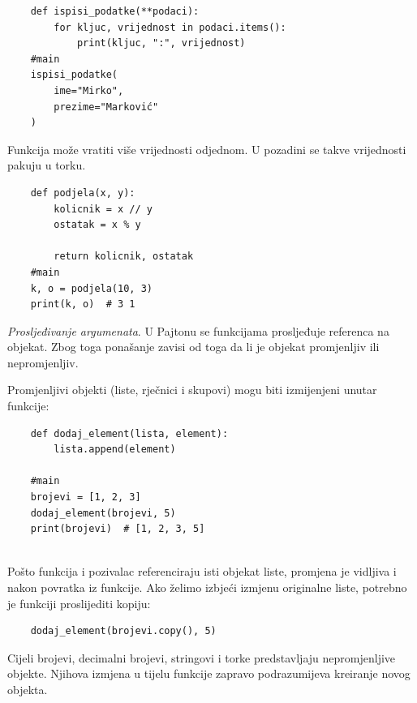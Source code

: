 \begin{verbatim}
	def ispisi_podatke(**podaci):
	    for kljuc, vrijednost in podaci.items():
	        print(kljuc, ":", vrijednost)
	#main
	ispisi_podatke(
	    ime="Mirko",
	    prezime="Marković"
	)
\end{verbatim}


Funkcija može vratiti više vrijednosti odjednom. U pozadini se takve vrijednosti pakuju u torku.

\begin{verbatim}
	def podjela(x, y):
	    kolicnik = x // y
	    ostatak = x % y
	
	    return kolicnik, ostatak
	#main
	k, o = podjela(10, 3)
	print(k, o)  # 3 1
\end{verbatim}

\textit{Prosljeđivanje argumenata}.  U Pajtonu se funkcijama prosljeđuje referenca na objekat. Zbog toga ponašanje zavisi od toga da li je objekat promjenljiv ili nepromjenljiv.

Promjenljivi objekti (liste, rječnici i skupovi) mogu biti izmijenjeni unutar funkcije:

\begin{verbatim}
	def dodaj_element(lista, element):
	    lista.append(element)
	
	#main
	brojevi = [1, 2, 3]
	dodaj_element(brojevi, 5)
	print(brojevi)  # [1, 2, 3, 5]
	
\end{verbatim}

Pošto funkcija i pozivalac referenciraju isti objekat liste, promjena je vidljiva i nakon povratka iz funkcije. Ako želimo izbjeći izmjenu originalne liste, potrebno je funkciji proslijediti kopiju:

\begin{verbatim}
	dodaj_element(brojevi.copy(), 5)
\end{verbatim}


Cijeli brojevi, decimalni brojevi, stringovi i torke predstavljaju nepromjenljive objekte. Njihova izmjena u tijelu funkcije zapravo podrazumijeva kreiranje novog objekta.

